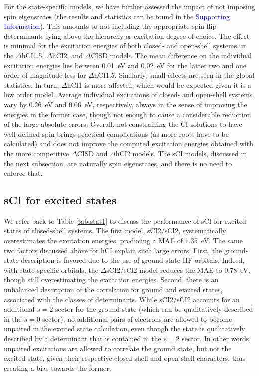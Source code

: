 \documentclass[aip,jcp,reprint,noshowkeys,superscriptaddress]{revtex4-1}
\newcommand{\SupInf}{\textcolor{blue}{Supporting Information}}
\begin{document}
For the state-specific models, we have further assessed the impact of not imposing spin eigenstates (the results and statistics can be found in the {\SupInf}).
This amounts to not including the appropriate spin-flip determinants lying above the hierarchy or excitation degree of choice.
The effect is minimal for the excitation energies of both closed- and open-shell systems, in the $\Delta$hCI1.5, $\Delta$hCI2, and $\Delta$CISD models.
The mean difference on the individual excitation energies lies between \SI{0.01}{\eV} and \SI{0.02}{\eV} for the latter two and one order of magnitude less for $\Delta$hCI1.5.
Similarly, small effects are seen in the global statistics.
In turn, $\Delta$hCI1 is more affected, which would be expected given it is a low order model.
Average individual excitations of closed- and open-shell systems vary by \SI{0.26}{\eV} and \SI{0.06}{\eV}, respectively, always in the sense of improving the energies in the former case,
though not enough to cause a considerable reduction of the large absolute errors.
Overall, not constraining the CI solutions to have well-defined spin brings practical complications (as more roots have to be calculated)
and does not improve the computed excitation energies obtained with the more competitive $\Delta$CISD and $\Delta$hCI2 models.
The sCI models, discussed in the next subsection, are naturally spin eigenstates, and there is no need to enforce that.

\subsection{sCI for excited states}
\label{sec:res_D}

We refer back to Table \ref{tab:stat1} to discuss the performance of sCI for excited states of closed-shell systems.
The first model, sCI2/sCI2, systematically overestimates the excitation energies, producing a MAE of \SI{1.35}{\eV}.
The same two factors discussed above for hCI explain such large errors.
First, the ground-state description is favored due to the use of ground-state HF orbitals.
Indeed, with state-specific orbitals, the $\Delta$sCI2/sCI2 model reduces the MAE to \SI{0.78}{\eV}, though still overestimating the excitation energies.
Second, there is an unbalanced description of the correlation for ground and excited states, associated with the classes of determinants.
While sCI2/sCI2 accounts for an additional $s=2$ sector for the ground state (which can be qualitatively described in the $s=0$ sector),
no additional pairs of electrons are allowed to become unpaired in the excited state calculation, even though the state is qualitatively described by a determinant that is contained in the $s=2$ sector.
In other words, unpaired excitations are allowed to correlate the ground state, but not the excited state, given their respective closed-shell and open-shell characters,
thus creating a bias towards the former.
\end{document}
